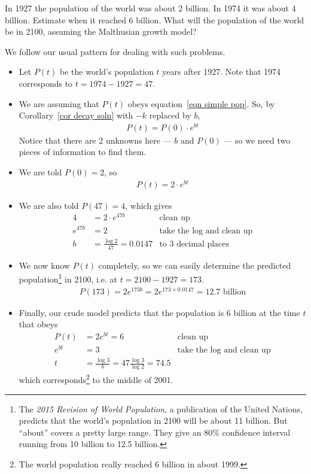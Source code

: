 \begin{eg}\label{eg:SDEpopgthA}
In 1927 the population of the world was about 2 billion.
In 1974 it was about 4 billion. Estimate when it reached
6 billion. What will the population of the world be in 2100,
assuming the Malthusian growth model?

 \soln We follow our usual pattern for dealing with such problems.
 \begin{itemize}
 \item Let $P(t)$ be the world's population $t$ years after 1927.
Note that 1974 corresponds to $t=1974-1927 = 47$.

 \item We are assuming that $P(t)$ obeys equation~\eqref{eqn simple pop}. So,
by Corollary~\ref{cor decay soln} with $-k$ replaced by $b$,
 \begin{align*}
           P(t)=P(0)\cdot e^{bt}
 \end{align*}
 Notice that there are 2 unknowns here --- $b$ and $P(0)$
  --- so we need two pieces of information to find them.

 \item We are told $P(0)=2$, so
 \begin{align*}
   P(t)=2\cdot e^{bt}
 \end{align*}
 \item We are also told $P(47)=4$, which gives
 \begin{align*}
   4 &=2\cdot e^{47b} & \text{clean up}\\
   e^{47b}&=2 & \text{take the log and clean up}\\
   b&=\frac{\log 2}{47} = 0.0147 & \text{to 3 decimal places}
 \end{align*}
 \item We now know $P(t)$ completely, so we can easily determine
the predicted population\footnote{The \emph{2015 Revision of
World Population}, a publication of the United Nations, predicts
that the world's population in 2100 will be about 11 billion.
But ``about'' covers a pretty large range. They give an 80\% confidence
interval running from 10 billion to 12.5 billion.} in 2100,
i.e. at $t=2100-1927 = 173$.
 \begin{align*}
   P(173) = 2 e^{173 b} = 2 e^{173\times 0.0147} = 12.7\text{ billion}
 \end{align*}

\item Finally, our crude model predicts that the population is
6 billion at the time $t$ that obeys
 \begin{align*}
   P(t) &= 2 e^{b t} = 6 & \text{clean up}\\
   e^{b t}&=3 & \text{take the log and clean up}\\
   t&=\frac{\log 3}{b} = 47\frac{\log 3}{\log 2}
                       = 74.5
 \end{align*}
which corresponds\footnote{The world population really reached
6 billion in about 1999.}  to the middle of 2001.
\end{itemize}
\end{eg}
